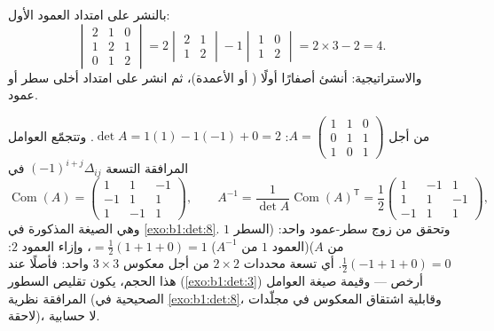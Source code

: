 \begin{example}\label{ex:b1:det:cofactor}
بالنشر على امتداد العمود الأول:
\[
\begin{vmatrix}
2 & 1 & 0\\
1 & 2 & 1\\
0 & 1 & 2
\end{vmatrix}
= 2\begin{vmatrix} 2 & 1\\ 1 & 2\end{vmatrix}
- 1\begin{vmatrix} 1 & 0\\ 1 & 2\end{vmatrix}
= 2 \times 3 - 2 = 4 .
\]
والاستراتيجية: أنشئ أصفارًا أولًا ( أو الأعمدة)، ثم انشر
على امتداد أخلى سطر أو عمود.
\end{example}

\begin{example}
\label{ex:b1:det:cofactorinverse}
من أجل $A = \begin{pmatrix} 1 & 1 & 0\\ 0 & 1 & 1\\ 1 & 0 &
1\end{pmatrix}$: $\det A = 1(1) - 1(-1) + 0 = 2$. وتتجمّع
العوامل المرافقة التسعة $(-1)^{i+j}\Delta_{ij}$ في
\[
\operatorname{Com}(A) = \begin{pmatrix}
1 & 1 & -1\\
-1 & 1 & 1\\
1 & -1 & 1
\end{pmatrix},
\qquad
A^{-1} = \frac{1}{\det A}\operatorname{Com}(A)^{\mathsf T}
= \frac12\begin{pmatrix}
1 & -1 & 1\\
1 & 1 & -1\\
-1 & 1 & 1
\end{pmatrix},
\]
وهي الصيغة المذكورة في \cref{exo:b1:det:8}. وتحقق من زوج
سطر-عمود واحد: (السطر $1$ من $A$)(العمود $1$ من $A^{-1}$) $= \frac12(1 + 1
+ 0) = 1$، وإزاء العمود $2$: $\frac12(-1 + 1 + 0) = 0$.
أي تسعة محددات $2\times2$ من أجل معكوس $3\times3$ واحد: فأصلًا
عند هذا الحجم، يكون تقليص السطور (\cref{exo:b1:det:3}) أرخص ---
وقيمة صيغة العوامل المرافقة نظرية (الصحيحية في
\cref{exo:b1:det:8}، وقابلية اشتقاق المعكوس في مجلّدات لاحقة)،
لا حسابية.
\end{example}

